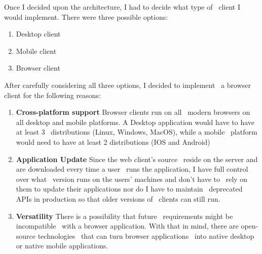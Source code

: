 Once I decided upon the architecture, I had to decide what type of \
client I would implement.
There were three possible options:
\begin{enumerate}
    \item Desktop client
    \item Mobile client
    \item Browser client
\end{enumerate}

After carefully considering all three options, I decided to implement \
a browser client for the following reasons:
\begin{enumerate}
    \item \textbf{Cross-platform support} Browser clients run on all \
            modern browsers on all desktop and mobile platforms.
            A Desktop application would have to have at least  3 \
            distributions (Linux, Windows, MacOS), while a mobile \
            platform would need to have at least 2 distributions
            (IOS and Android)
    \item \textbf{Application Update} Since the web client's source \
            reside on the server and are downloaded every time a user \
            runs the application, I have full control over what \
            version runs on the users' machines and don't have to \
            rely on them to update their applications nor do I have to maintain \
            deprecated APIs in production so that older versions of \
            clients can still run.
    \item \textbf{Versatility} There is a possibility that future \
            requirements might be incompatible \
            with a browser application.
            With that in mind, there are open-source technologies \
            that can turn browser applications \
            into native desktop or native mobile applications.
\end{enumerate}

